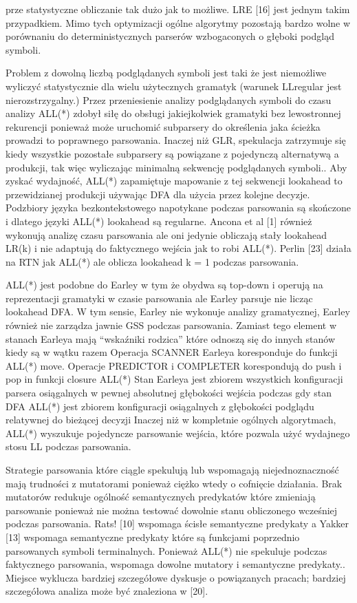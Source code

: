 prze statystyczne obliczanie tak dużo jak to możliwe. LRE [16] jest jednym
takim przypadkiem. Mimo tych optymizacji ogólne algorytmy pozostają
bardzo wolne w porównaniu do deterministycznych parserów wzbogaconych
o głęboki podgląd symboli.
\par
Problem z dowolną liczbą podglądanych symboli jest taki że jest niemożliwe
wyliczyć statystycznie dla wielu użytecznych gramatyk (warunek LLregular jest nierozstrzygalny.) Przez przeniesienie analizy podglądanych symboli do czasu analizy ALL(*) zdobył siłę do obsługi jakiejkolwiek gramatyki bez lewostronnej rekurencji ponieważ może uruchomić subparsery do określenia jaka ścieżka prowadzi to poprawnego parsowania. Inaczej niż GLR,
spekulacja zatrzymuje się kiedy wszystkie pozostałe subparsery są powiązane z pojedynczą alternatywą a produkcji, tak więc wyliczając minimalną sekwencję podglądanych symboli.. Aby zyskać wydajność, ALL(*) zapamiętuje mapowanie z tej sekwencji lookahead to przewidzianej produkcji używając DFA dla użycia przez kolejne decyzje.
Podzbiory języka bezkontekstowego napotykane podczas parsowania są skończone i dlatego języki ALL(*) lookahead są regularne.
Ancona et al [1] również wykonują analizę czasu parsowania ale oni
jedynie obliczają stały lookahead LR(k) i nie adaptują do faktycznego wejścia jak to robi ALL(*).
Perlin [23] działa na RTN jak ALL(*) ale oblicza  lookahead k = 1 podczas parsowania.
\par
ALL(*) jest podobne do Earley w tym że obydwa są top-down i
operują na reprezentacji gramatyki w czasie parsowania ale
Earley parsuje nie licząc lookahead DFA. W tym sensie,
Earley nie wykonuje analizy gramatycznej, Earley również nie zarządza jawnie
GSS podczas parsowania. Zamiast tego element w stanach Earleya
mają “wskaźniki rodzica” które odnoszą się do innych stanów
kiedy są w wątku razem
Operacja SCANNER Earleya
koresponduje do funkcji ALL(*) move. Operacje PREDICTOR i COMPLETER
korespondują do push i pop in funkcji closure ALL(*)
Stan Earleya jest zbiorem wszystkich konfiguracji parsera osiągalnych
w pewnej absolutnej głębokości wejścia podczas gdy stan DFA ALL(*) jest zbiorem konfiguracji
osiągalnych z głębokości podglądu relatywnej do bieżącej decyzji
Inaczej niż w kompletnie ogólnych algorytmach, ALL(*) wyszukuje
pojedyncze parsowanie wejścia, które pozwala użyć wydajnego stosu LL podczas parsowania.
\par
Strategie parsowania które ciągle spekulują lub wspomagają niejednoznaczność
mają trudności z mutatorami ponieważ ciężko wtedy o cofnięcie działania.
Brak mutatorów redukuje ogólność semantycznych predykatów które zmieniają parsowanie ponieważ nie można testować dowolnie stanu obliczonego wcześniej podczas parsowania.
Rats! [10] wspomaga ścisłe semantyczne predykaty a Yakker [13] wspomaga
semantyczne predykaty które są funkcjami poprzednio parsowanych symboli terminalnych.
Ponieważ ALL(*) nie spekuluje podczas faktycznego parsowania, wspomaga dowolne mutatory i semantyczne predykaty..
Miejsce wyklucza bardziej szczegółowe dyskusje o powiązanych pracach; bardziej szczegółowa analiza może być znaleziona w [20].
